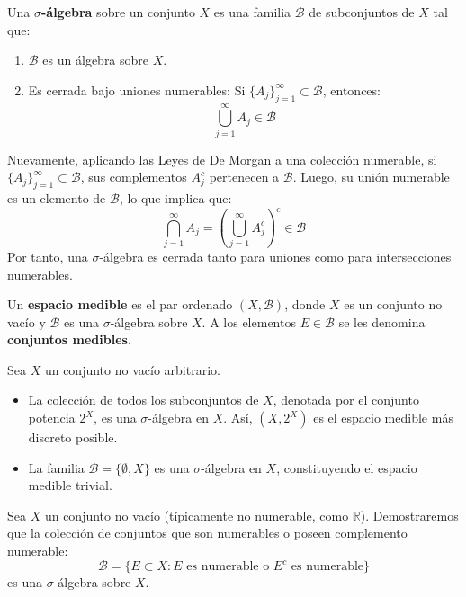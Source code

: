 \begin{definicion}
	Una \textbf{$\sigma$-álgebra} sobre un conjunto $X$ es una familia $\mathcal{B}$ de subconjuntos de $X$ tal que:
	\begin{enumerate}[1)]
		\item $\mathcal{B}$ es un álgebra sobre $X$.
		\item Es cerrada bajo uniones numerables: Si $\{A_j\}_{j=1}^\infty \subset \mathcal{B}$, entonces:
		$$ \bigcup_{j=1}^\infty A_j \in \mathcal{B} $$
	\end{enumerate}
\end{definicion}

\begin{observacion}
	Nuevamente, aplicando las Leyes de De Morgan a una colección numerable, si $\{A_j\}_{j=1}^\infty \subset \mathcal{B}$, sus complementos $A_j^c$ pertenecen a $\mathcal{B}$. Luego, su unión numerable es un elemento de $\mathcal{B}$, lo que implica que:
	$$ \bigcap_{j=1}^\infty A_j = \left( \bigcup_{j=1}^\infty A_j^c \right)^c \in \mathcal{B} $$
	Por tanto, una $\sigma$-álgebra es cerrada tanto para uniones como para intersecciones numerables.
\end{observacion}

\begin{definicion}
	Un \textbf{espacio medible} es el par ordenado $(X, \mathcal{B})$, donde $X$ es un conjunto no vacío y $\mathcal{B}$ es una $\sigma$-álgebra sobre $X$. A los elementos $E \in \mathcal{B}$ se les denomina \textbf{conjuntos medibles}.
\end{definicion}

\begin{ejemplo}
	Sea $X$ un conjunto no vacío arbitrario.
	\begin{itemize}
		\item La colección de todos los subconjuntos de $X$, denotada por el conjunto potencia $2^X$, es una $\sigma$-álgebra en $X$. Así, $(X, 2^X)$ es el espacio medible más discreto posible.
		\item La familia $\mathcal{B} = \{\emptyset, X\}$ es una $\sigma$-álgebra en $X$, constituyendo el espacio medible trivial.
	\end{itemize}
\end{ejemplo}

\begin{ejemplo}
	Sea $X$ un conjunto no vacío (típicamente no numerable, como $\mathbb{R}$). Demostraremos que la colección de conjuntos que son numerables o poseen complemento numerable:
	$$ \mathcal{B} = \{E \subset X : E \text{ es numerable o } E^c \text{ es numerable}\} $$
	es una $\sigma$-álgebra sobre $X$.
\end{ejemplo}

